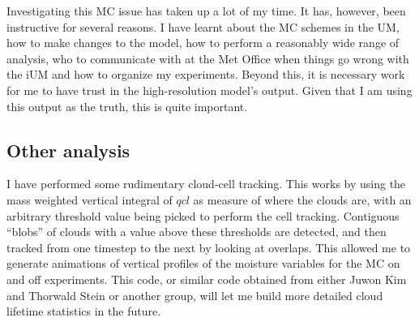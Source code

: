 \documentclass[11pt,a4paper]{article}
\begin{document}
Investigating this MC issue has taken up a lot of my time. It has, however, been instructive for several reasons. I have learnt about the MC schemes in the UM, how to make changes to the model, how to perform a reasonably wide range of analysis, who to communicate with at the Met Office when things go wrong with the iUM and how to organize my experiments. Beyond this, it is necessary work for me to have trust in the high-resolution model's output. Given that I am using this output as the truth, this is quite important. 


\subsection{Other analysis}

I have performed some rudimentary cloud-cell tracking. This works by using the mass weighted vertical integral of $qcl$ as measure of where the clouds are, with an arbitrary threshold value being picked to perform the cell tracking. Contiguous ``blobs'' of clouds with a value above these thresholds are detected, and then tracked from one timestep to the next by looking at overlaps. This allowed me to generate animations of vertical profiles of the moisture variables for the MC on and off experiments. This code, or similar code obtained from either Juwon Kim and Thorwald Stein or another group, will let me build more detailed cloud lifetime statistics in the future. 

\end{document}
